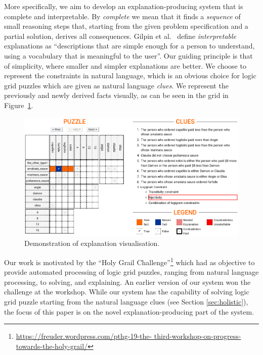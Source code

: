 More specifically, we aim to develop an explanation-producing system that is complete and interpretable. 
By \textit{complete} we mean that it finds a \textit{sequence} of small reasoning steps that, starting from the given problem specification and a partial solution, derives all consequences. 
Gilpin et al.~\cite{DBLP:conf/dsaa/GilpinBYBSK18} define \textit{interpretable} explanations as ``descriptions that are simple enough for a person to understand, using a vocabulary that is meaningful to the user''. 
Our guiding principle is that of simplicity, where smaller and simpler explanations are better.
We choose to represent the constraints in natural language, which is an obvious choice for logic grid puzzles which are given as natural language \textit{clues}. 
We represent the previously and newly derived facts visually, as can be seen in the grid in Figure~\ref{fig:zebrascreen}.

\begin{figure}[ht]
\centering
\includegraphics[width=\linewidth]{figures/zebra_screen_1}
\caption{Demonstration of explanation visualisation.}
\label{fig:zebrascreen}
\end{figure}

Our work is motivated by the ``Holy Grail Challenge''\footnote{\tiny \url{https://freuder.wordpress.com/pthg-19-the- third-workshop-on-progress-towards-the-holy-grail/}} which had as objective to provide automated processing of logic grid puzzles, ranging from natural language processing, to solving, and explaining. 
An earlier version of our system won the challenge at the workshop. 
While our system has the capability of solving logic grid puzzle starting from the natural language clues (see Section \ref{sec:holistic}), the focus of this paper is on the novel explanation-producing part of the system.

